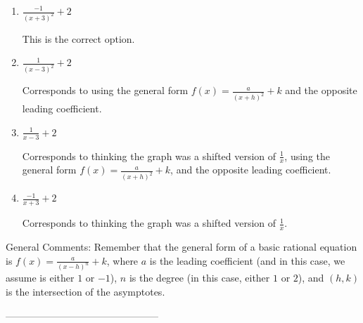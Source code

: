 \documentclass{article}[10pt]
\begin{document}
\begin{enumerate}[label=\Alph*.] 
\item $ \frac{-1}{(x + 3)^2} + 2 $ 

 This is the correct option. 
\item $ \frac{1}{(x - 3)^2} + 2 $ 

 Corresponds to using the general form $f(x) = \frac{a}{(x+h)^2}+k$ and the opposite leading coefficient. 
\item $ \frac{1}{x - 3} + 2 $ 

 Corresponds to thinking the graph was a shifted version of $\frac{1}{x}$, using the general form $f(x) = \frac{a}{(x+h)^2}+k$, and the opposite leading coefficient. 
\item $ \frac{-1}{x + 3} + 2 $ 

 Corresponds to thinking the graph was a shifted version of $\frac{1}{x}$. 
\end{enumerate} 
 
General Comments: Remember that the general form of a basic rational equation is $ f(x) = \frac{a}{(x-h)^n} + k$, where $a$ is the leading coefficient (and in this case, we assume is either $1$ or $-1$), $n$ is the degree (in this case, either $1$ or $2$), and $(h, k)$ is the intersection of the asymptotes.

-----------------------------------------------
\end{document}
